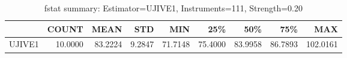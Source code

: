 \begin{table}[ht]
\centering
\caption{fstat summary: Estimator=UJIVE1, Instruments=111, Strength=0.20}
\begin{tabular}{lrrrrrrrr}
\toprule
 & COUNT & MEAN & STD & MIN & 25\% & 50\% & 75\% & MAX \\
\midrule
UJIVE1 & 10.0000 & 83.2224 & 9.2847 & 71.7148 & 75.4000 & 83.9958 & 86.7893 & 102.0161 \\
\bottomrule
\end{tabular}
\end{table}

